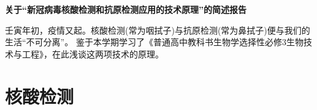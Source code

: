 \documentclass[UTF8,a4paper,11 pt]{ctexart}%
\begin{document}
	\setlength{\lineskip}{8pt}
	\setlength{\lineskiplimit}{8pt}
	\pagestyle{fancy}
	\fancyhead[C]{} %
	\fancyfoot[C]{\thepage}
	\begin{center}
		\LARGE{\textbf{关于“新冠病毒核酸检测和抗原检测应用的技术原理”的简述报告}}
	\end{center}
	\mbox{\qquad}壬寅年初，疫情又起。核酸检测(常为咽拭子)与抗原检测(常为鼻拭子)便与我们的生活“不可分离”。
	鉴于本学期学习了《普通高中教科书\:\:生物学\:\:选择性必修3\:\:生物技术与工程》，在此浅谈这两项技术的原理。
	\part{核酸检测}
	\def\CD#1{
		\edef\code{
			\unexpanded{\begin{scope}[xshift=}#1
				\unexpanded{cm, yshift=2.7 cm]%
					\draw[fill=purple] (0,-1) -- (0,0)--(.5,0)--(.5,-1)arc (0:180:0.25);
					\node at (.25,-.25) {C};
			\end{scope}}
		}\code
	}
	\def\GD#1{
		\edef\code{
			\unexpanded{\begin{scope}[xshift=}#1
				\unexpanded{cm, yshift=2.7 cm]%
					\draw[fill=blue] (0,-1.2) -- (0,0)--(.5,0)--(.5,-1.2)arc (0:-180:0.25);
					\node at (.25,-.25) {G};
			\end{scope}}
		}\code
	}
	\def\AD#1{
		\edef\code{
			\unexpanded{\begin{scope}[xshift=}#1
				\unexpanded{cm, yshift=2.7 cm]%
					\draw[fill=yellow] (0,-1.2) -- (0,0)--(.5,0)--(.5,-1.2) --(.25,-1.45)--(0,-1.2);
					\node at (.25,-.25) {A};
				\end{scope}
			}
		}\code
	}
	\def\UD#1{
		\edef\code{
			\unexpanded{
				\begin{scope}[xshift=}#1
				\unexpanded{cm, yshift=2.7 cm]%
					\draw[fill=orange] (0,-1) -- (0,0)--(.5,0)--(.5,-1) --(.25,-.75)--(0,-1);
					\node at (.25,-.25) {U};
				\end{scope}
			}
		}\code
	}
	\def\TD#1{
		\edef\code{
			\unexpanded{\begin{scope}[xshift=}#1
				\unexpanded{cm, yshift=2.7 cm]%
					\draw[fill=green] (0,-1) -- (0,0)--(.5,0)--(.5,-1) --(.25,-.75)--(0,-1);
					\node at (.25,-.25) {T};
				\end{scope}
			}
		}\code
	}
	\def\CU#1{
		\edef\code{
			\unexpanded{\begin{scope}[xshift=}#1
				\unexpanded{cm, yshift=.3 cm]%
					\draw[fill=purple] (0,1) -- (0,0)--(.5,0)--(.5,1)arc (0:-180:0.25);
					\node at (.25,.25) {C};
			\end{scope}}
		}\code
	}
\end{document}
